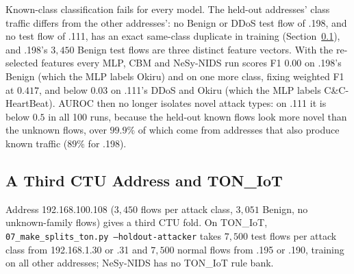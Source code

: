 \documentclass[journal]{IEEEtran}
\begin{document}
Known-class classification fails for every model. The held-out addresses' class traffic differs
from the other addresses': no Benign or DDoS test flow of .198, and no test flow of .111, has an
exact same-class duplicate in training (Section~\ref{sec:device2}), and .198's $3{,}450$ Benign test
flows are three distinct feature vectors. With the re-selected features every MLP, CBM and NeSy-NIDS
run scores F1 $0.00$ on .198's Benign (which the MLP labels Okiru) and on one more class, fixing
weighted F1 at $0.417$, and below $0.03$ on .111's DDoS and Okiru (which the MLP labels
C\&C-HeartBeat). AUROC then no longer isolates novel attack types: on .111 it is below $0.5$ in all
100 runs, because the held-out known flows look more novel than the unknown flows, over $99.9\%$ of
which come from addresses that also produce known traffic ($89\%$ for .198).

\subsection{A Third CTU Address and TON\_IoT}
\label{sec:device2}
Address 192.168.100.108 ($3{,}450$ flows per attack class, $3{,}051$ Benign, no unknown-family flows)
gives a third CTU fold. On TON\_IoT, \texttt{07\_make\_splits\_ton.py --holdout-attacker} takes
$7{,}500$ test flows per attack class from 192.168.1.30 or .31 and $7{,}500$ normal flows from .195 or
.190, training on all other addresses; NeSy-NIDS has no TON\_IoT rule bank.
\end{document}
